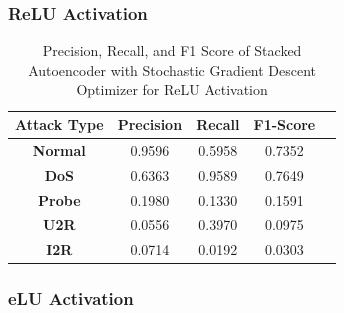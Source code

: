 \documentclass[12pt, a4paper]{report}
\begin{document}
\subsubsection{ReLU Activation}
\begin{table}[ht]
\centering
\captionsetup{justification=centering,margin=2cm}
\begin{tabular}{|c|c|c|c|c|}
\hline
\multicolumn{1}{|c|}{\textbf{Attack Type}} & \multicolumn{1}{c|}{\textbf{Precision}} & \multicolumn{1}{c|}{\textbf{Recall}} & \multicolumn{1}{c|}{\textbf{F1-Score}} \\ \hline
\textbf{Normal}        & 0.9596                                   & 0.5958                                & 0.7352                                                                  \\ \hline
\textbf{DoS}           & 0.6363                                  & 0.9589                                &  0.7649                                                                    \\ \hline
\textbf{Probe}         & 0.1980                                  & 0.1330                                & 0.1591                                                                  \\ \hline
\textbf{U2R}           & 0.0556                                    & 0.3970                                & 0.0975                                                                   \\ \hline
\textbf{I2R}           & 0.0714                                      & 0.0192                                   & 0.0303                                                            \\ \hline         \end{tabular}
\caption{Precision, Recall, and F1 Score of Stacked Autoencoder with Stochastic Gradient Descent Optimizer for ReLU Activation}
\label{prf1_sgd_relu_auto}
\end{table}
\clearpage
\subsubsection{eLU Activation}
\end{document}
